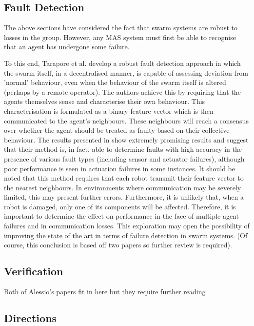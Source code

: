 \documentclass[preprint,11pt]{report}
\begin{document}
\subsection{Fault Detection}

The above sections have considered the fact that swarm systems are robust to losses in the group.
However, any MAS system must first be able to recognise that an agent has undergone some failure. 

To this end, Tarapore et al. \cite{Tarapore2019FaultDetection} develop a robust fault detection
approach in which the swarm itself, in a decentralised manner, is capable of assessing deviation
from 'normal' behaviour, even when the behaviour of the swarm itself is altered (perhaps by a remote
operator). The authors achieve this by requiring that the agents themselves sense and characterise
their own behaviour. This characterisation is formulated as a binary feature vector which is then
communicated to the agent's neighbours. These neighbours will reach a consensus over whether the
agent should be treated as faulty based on their collective behaviour. The results presented in
\cite{Tarapore2019FaultDetection} show extremely promising results and suggest that their method is,
in fact, able to determine faults with high accuracy in the presence of various fault types
(including sensor and actuator failures), although poor performance is seen in actuation failures in
some instances. It should be noted that this method requires that each robot transmit their feature
vector to the nearest neighbours. In environments where communication may be severely limited, this
may present further errors. Furthermore, it is unlikely that, when a robot is damaged, only one of
its components will be affected. Therefore, it is important to determine the effect on performance
in the face of multiple agent failures and in communication losses. This exploration may open the
possibility of improving the state of the art in terms of failure detection in swarm systems. (Of
course, this conclusion is based off two papers so further review is required).

\subsection{Verification}

Both of Alessio's papers \cite{Kouvaros2019FormalSystems, Lomuscio2019ASystems} fit in here but they
require further reading

\subsection{Directions}
\end{document}
